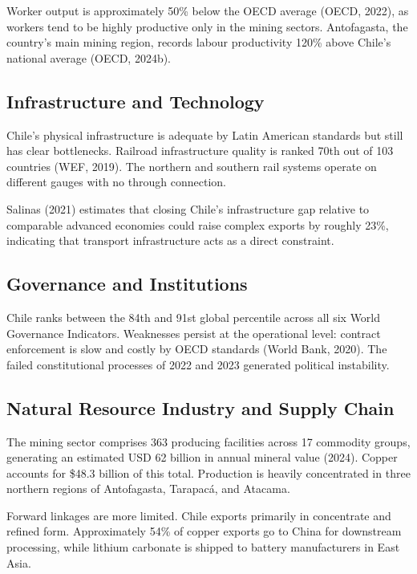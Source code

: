 \documentclass[12pt,a4paper]{report}
\begin{document}
Worker output is approximately 50\% below the OECD average (OECD, 2022), as workers tend to be highly productive only in the mining sectors. Antofagasta, the country's main mining region, records labour productivity 120\% above Chile's national average (OECD, 2024b).

\subsection{Infrastructure and Technology}

Chile's physical infrastructure is adequate by Latin American standards but still has clear bottlenecks. Railroad infrastructure quality is ranked 70th out of 103 countries (WEF, 2019). The northern and southern rail systems operate on different gauges with no through connection.

Salinas (2021) estimates that closing Chile's infrastructure gap relative to comparable advanced economies could raise complex exports by roughly 23\%, indicating that transport infrastructure acts as a direct constraint.

\subsection{Governance and Institutions}

Chile ranks between the 84th and 91st global percentile across all six World Governance Indicators. Weaknesses persist at the operational level: contract enforcement is slow and costly by OECD standards (World Bank, 2020). The failed constitutional processes of 2022 and 2023 generated political instability.

\subsection{Natural Resource Industry and Supply Chain}

The mining sector comprises 363 producing facilities across 17 commodity groups, generating an estimated USD 62 billion in annual mineral value (2024). Copper accounts for \$48.3 billion of this total. Production is heavily concentrated in three northern regions of Antofagasta, Tarapac\'{a}, and Atacama.

Forward linkages are more limited. Chile exports primarily in concentrate and refined form. Approximately 54\% of copper exports go to China for downstream processing, while lithium carbonate is shipped to battery manufacturers in East Asia.
\end{document}
